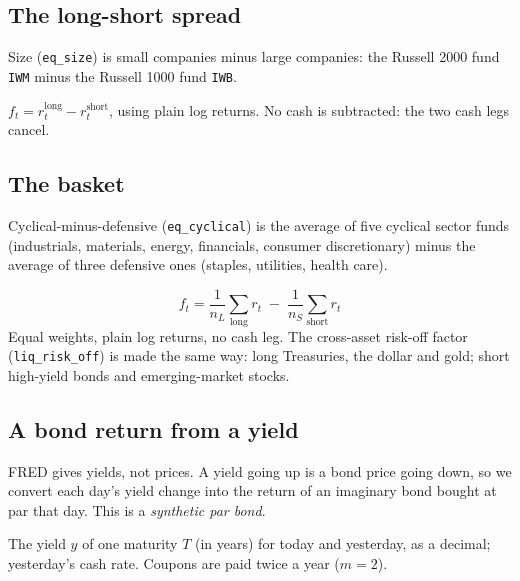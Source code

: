 \documentclass[11pt,a4paper]{article}
\newcommand{\fid}[1]{\texttt{#1}}
\begin{document}
\subsection{The long-short spread}

Size (\fid{eq\_size}) is small companies minus large companies: the Russell 2000 fund
\texttt{IWM} minus the Russell 1000 fund \texttt{IWB}.

\begin{method}
$f_t = r^{\text{long}}_t - r^{\text{short}}_t$, using plain log returns. No cash is
subtracted: the two cash legs cancel.
\end{method}

\subsection{The basket}

Cyclical-minus-defensive (\fid{eq\_cyclical}) is the average of five cyclical sector
funds (industrials, materials, energy, financials, consumer discretionary) minus
the average of three defensive ones (staples, utilities, health care).

\begin{method}
\[
  f_t = \frac{1}{n_L}\sum_{\text{long}} r_t \;-\; \frac{1}{n_S}\sum_{\text{short}} r_t
\]
Equal weights, plain log returns, no cash leg. The cross-asset risk-off factor
(\fid{liq\_risk\_off}) is made the same way: long Treasuries, the dollar and gold;
short high-yield bonds and emerging-market stocks.
\end{method}

\subsection{A bond return from a yield}\label{rec:bond}

FRED gives yields, not prices. A yield going up is a bond price going down, so we
convert each day's yield change into the return of an imaginary bond bought at par
that day. This is a \emph{synthetic par bond}.

\begin{ingredients}
The yield $y$ of one maturity $T$ (in years) for today and yesterday, as a decimal;
yesterday's cash rate. Coupons are paid twice a year ($m=2$).
\end{ingredients}
\end{document}
